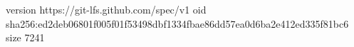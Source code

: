 version https://git-lfs.github.com/spec/v1
oid sha256:ed2deb06801f005f01f53498dbf1334fbae86dd57ea0d6ba2e412ed335f81bc6
size 7241
